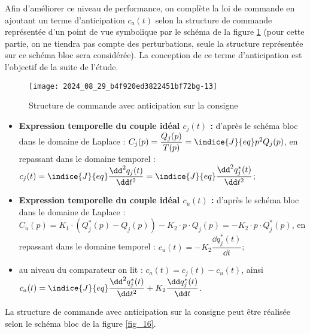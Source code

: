 Afin d'améliorer ce niveau de performance, on complète la loi de commande en ajoutant un terme d'anticipation $c_{a}(t)$ selon la structure de commande représentée d'un point de vue symbolique par le schéma de la figure \ref{fig_15} (pour cette partie, on ne tiendra pas compte des perturbations, seule la structure représentée sur ce schéma bloc sera considérée). La conception de ce terme d'anticipation est l'objectif de la suite de l'étude.

\begin{figure}[!h]
\centering
\texttt{[image: 2024\_08\_29\_b4f920ed3822451bf72bg-13]}
\caption{\label{fig_15} Structure de commande avec anticipation sur la consigne}
\end{figure}

\ifprof
\begin{corrige}
\begin{itemize}
\item \textbf{Expression temporelle du couple idéal $c_j(t)$ : }
d'après le schéma bloc dans le domaine de Laplace : $C_j(p)=\dfrac{Q_j(p)}{T(p)}=\indice{J}{eq}p^2Q_j(p)$, en repassant dans le domaine temporel : 
$
c_j(t)=\indice{J}{eq}\dfrac{\dd ^2q_j(t)}{\dd t^2}=\indice{J}{eq}\dfrac{\dd ^2q^*_j(t)}{\dd t^2}
$;
\item \textbf{Expression temporelle du couple idéal $c_u(t)$ : }
d'après le schéma bloc dans le domaine de Laplace : $C_u(p)=K_1\cdot (Q^*_j(p)-Q_j(p))-K_2\cdot p\cdot Q_j(p)=-K_2\cdot p\cdot Q^*_j(p)$, en repassant dans le domaine temporel : 
$
c_u(t)=-K_{2}\dfrac{\dd q^*_j(t)}{\dd t}$;
\item au niveau du comparateur on lit : $c_a(t)=c_j(t)-c_u(t)$, ainsi $c_a(t)=\indice{J}{eq}\dfrac{\dd ^2q^*_j(t)}{\dd t^2}+K_{2}\dfrac{\dd q^*_j(t)}{\dd t}$.
\end{itemize}
\end{corrige}
\else
\fi


La structure de commande avec anticipation sur la consigne peut être réalisée selon le schéma bloc de la figure \ref{fig_16}.

